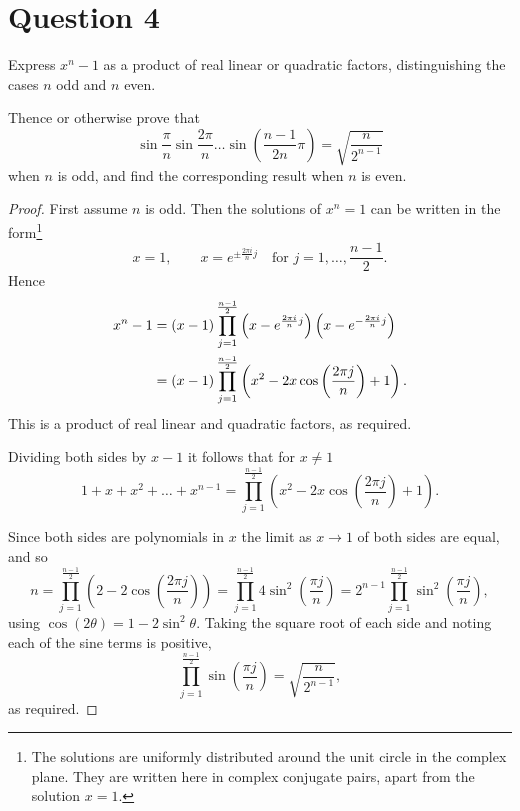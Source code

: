 \documentclass[11pt,a4paper]{report}
\theoremstyle{plain}
\theoremstyle{definition}
\begin{document}
 
 
\newpage
\section*{Question 4}

Express $ x^n - 1 $ as a product of real linear or quadratic factors, distinguishing the cases $ n $ odd and $ n $ even.

Thence or otherwise prove that
\[
\sin\frac{\pi}{n} \sin\frac{2\pi}{n} \ldots \sin \left(\frac{n-1}{2n} \pi \right) = \sqrt{\frac{n}{2^{n-1}}}
\]
when $ n $ is odd, and find the corresponding result when $ n $ is even.

\bigskip
\begin{proof} \mbox{}

First assume $ n $ is odd.  Then the solutions of $ x^n = 1 $ can be written in the form\footnote{The solutions are uniformly distributed around the unit circle in the complex plane.  They are written here in complex conjugate pairs, apart from the solution $ x=1 $.} 
\[
x=1, \qquad x = e^{\pm   \frac{2\pi i }{n}j} \quad \text{for } j =1,\dots, \frac{n-1}{2}.
\]
Hence 
\begin{align}
x^n - 1 &= (x-1)   \prod_{j=1}^{\frac{n-1}{2}} \left(x- e^{  \frac{2\pi i }{n}j} \right) \left(x- e^{-  \frac{2\pi i }{n}j} \right) \notag \\
	&= (x-1)  \prod_{j=1}^{\frac{n-1}{2}} \left( x^2 - 2x\cos\left(\frac{2\pi j}{n}   \right) +1 \right). \label{fac1}
\end{align}
This is a product of real linear and quadratic factors, as required.

\bigskip
 
Dividing both sides by $ x-1 $ it follows that for $ x\neq 1  $
\begin{equation} \label{tricky} 
1+x+x^2 + \dots + x^{n-1} = \prod_{j=1}^{\frac{n-1}{2}} \left( x^2 - 2x\cos\left(\frac{2\pi j}{n}  \right) +1 \right).
\end{equation} 

Since both sides are polynomials in $ x $ the limit as $ x \to 1 $ of both sides are equal, and so
\[
n  = \prod_{j=1}^{\frac{n-1}{2}} \left(  2 - 2 \cos\left(\frac{2\pi j}{n}   \right)   \right)  
	 =  \prod_{j=1}^{\frac{n-1}{2}}  4 \sin^2 \left(\frac{ \pi j}{n} \right)    
	 = 2^{n-1}  \prod_{j=1}^{\frac{n-1}{2}}    \sin^2 \left(\frac{ \pi j}{n} \right) ,
\]
using $ \cos (2\theta) = 1 - 2\sin^2 \theta $.
Taking the square root of each side and noting each of the  sine   terms is positive,
\begin{equation} \label{fac2} 
\prod_{j=1}^{\frac{n-1}{2}}    \sin  \left(\frac{ \pi j}{n} \right) = \sqrt{\frac{n}{2^{n-1}}},
\end{equation} 
as required.


\end{proof}
\end{document}
